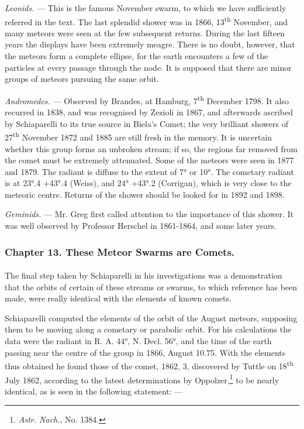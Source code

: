 \documentclass[a4paper, 12pt, oneside, polutonikogreek, english]{article}
\begin{document}
\emph{Leonids.} --- This is the famous November swarm, to which we have sufficiently referred in the text. The last splendid shower was in 1866, 13\textsuperscript{th} November, and many meteors were seen at the few subsequent returns. During the last fifteen years the displays have been extremely meagre. There is no doubt, however, that the meteors form a complete ellipse, for the earth encounters a few of the particles at every passage through the node. It is supposed that there are minor groups of meteors pursuing the same orbit.

\emph{Andromedes.} --- Observed by Brandes, at Hamburg, 7\textsuperscript{th} December 1798. It also recurred in 1838, and was recognised by Zezioli in 1867, and afterwards ascribed by Schiaparelli to its true source in Biela's Comet; the very brilliant showers of 27\textsuperscript{th} November 1872 and 1885 are still fresh in the memory. It is uncertain whether this group forms an unbroken stream; if so, the regions far removed from the comet must be extremely attenuated. Some of the meteors were seen in 1877 and 1879. The radiant is diffuse to the extent of 7° or 10°. The cometary radiant is at 23°.4 +43°.4 (Weiss), and 24° +43°.2 (Corrigan), which is very close to the meteoric centre. Returns of the shower should be looked for in 1892 and 1898.

\emph{Geminids.} --- Mr. Greg first called attention to the importance of this shower. It was well observed by Professor Herschel in 1861-1864, and some later years.
\clearpage
\subsubsection{Chapter 13. These Meteor Swarms are Comets.}
\paragraph{}
The final step taken by Schiaparelli in his investigations was a demonstration that the orbits of certain of these streams or swarms, to which reference has been made, were really identical with the elements of known comets.

Schiaparelli computed the elements of the orbit of the August meteors, supposing them to be moving along a cometary or parabolic orbit. For his calculations the data were the radiant in R. A. 44°, N. Decl. 56°, and the time of the earth passing near the centre of the group in 1866, August 10.75. With the elements thus obtained he found those of the comet, 1862, 3, discovered by Tuttle on 18\textsuperscript{th} July 1862, according to the latest determinations by Oppolzer,\footnote{\emph{Astr. Nach.}, No. 1384.} to be nearly identical, as is seen in the following statement: ---
\end{document}
